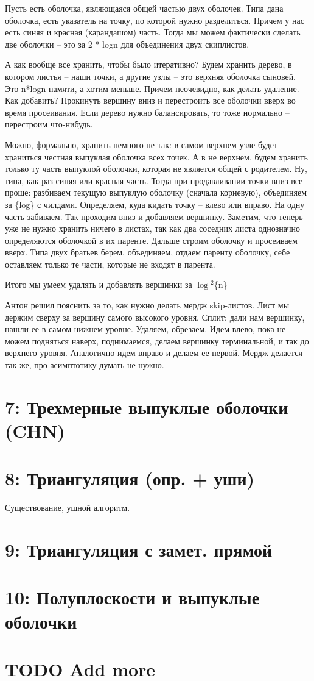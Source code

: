 \documentclass[11pt]{article}
\begin{document}
Пусть есть оболочка, являющаяся общей частью двух оболочек. Типа
дана оболочка, есть указатель на точку, по которой нужно
разделиться. Причем у нас есть синяя и красная (карандашом) часть.
Тогда мы можем фактически сделать две оболочки -- это за 2 * logn
для объединения двух скиплистов.

А как вообще все хранить, чтобы было итеративно? Будем хранить
дерево, в котором листья -- наши точки, а другие узлы -- это верхняя
оболочка сыновей. Это n*logn памяти, а хотим меньше. Причем
неочевидно, как делать удаление. Как добавить? Прокинуть вершину
вниз и перестроить все оболочки вверх во время просеивания. Если
дерево нужно балансировать, то тоже нормально -- перестроим
что-нибудь.

Можно, формально, хранить немного не так: в самом верхнем узле будет
храниться честная выпуклая оболочка всех точек. А в не верхнем,
будем хранить только ту часть выпуклой оболочки, которая не является
общей с родителем. Ну, типа, как раз синяя или красная часть. Тогда
при продавливании точки вниз все проще: разбиваем текущую выпуклую
оболочку (сначала корневую), объединяем за \{log\} с
чилдами. Определяем, куда кидать точку -- влево или вправо. На одну
часть забиваем. Так проходим вниз и добавляем вершинку. Заметим, что
теперь уже не нужно хранить ничего в листах, так как два соседних
листа однозначно определяются оболочкой в их паренте. Дальше строим
оболочку и просеиваем вверх. Типа двух братьев берем, объединяем,
отдаем паренту оболочку, себе оставляем только те части, которые не
входят в парента.

Итого мы умеем удалять и добавлять вершинки за $\log$$^{\text{2}}$\{n\}


Антон решил пояснить за то, как нужно делать мердж skip-листов. Лист
мы держим сверху за вершину самого высокого уровня. Сплит: дали нам
вершинку, нашли ее в самом нижнем уровне. Удаляем, обрезаем. Идем
влево, пока не можем подняться наверх, поднимаемся, делаем вершинку
терминальной, и так до верхнего уровня. Аналогично идем вправо и
делаем ее первой. Мердж делается так же, про асимптотику думать не
нужно.
\section{{\bfseries{}} 7:  Трехмерные выпуклые оболочки (CHN)}
\label{sec-8}
\section{{\bfseries{}} 8:  Триангуляция (опр. + уши)}
\label{sec-9}
Существование, ушной алгоритм.
\section{{\bfseries{}} 9:  Триангуляция с замет. прямой}
\label{sec-10}
\section{{\bfseries{}} 10: Полуплоскости и выпуклые оболочки}
\label{sec-11}
\section{TODO Add more}
\label{sec-12}
\end{document}
